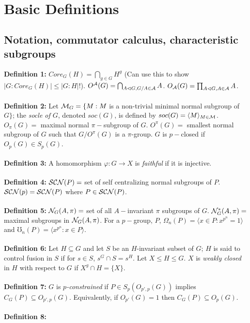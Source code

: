 \chapter{Basic Definitions}
\section{Notation, commutator calculus, characteristic subgroups}
{\bf Definition 1:}
$Core_G(H)= \bigcap_{g \in G} H^g$ (Can use this to show $|G:Core_G(H)|\le |G:H|!$).
$O^{\cal A}(G)= \bigcap_{A \lhd G, G/A \in {\cal A}} A$.
$O_{\cal A}(G)= \prod_{A \lhd G, A \in {\cal A}} A$.\\
\\
{\bf Definition 2:} Let ${\cal M}_G= \{ M: M$ is a non-trivial minimal normal subgroup of $G\}$;
the \emph{socle of $G$}, denoted
$soc(G)$, is defined by
$soc(G)= \langle M \rangle_{M \in {\cal M}}$.
$O_{\pi}(G)=$ maximal normal $\pi-$subgroup of $G$.
$O^{\pi}(G)=$ smallest normal subgroup of $G$ such that $G/O^{\pi}(G)$ is a $\pi$-group.
$G$ is $p-$closed if $O_p(G) \in S_p(G)$.
\\
\\
{\bf Definition 3:}
A homomorphism $\varphi: G \rightarrow X$ is \emph {faithful} if it is injective.
\\
\\
{\bf Definition 4:}
${\cal SCN}(P)=$ set of self centralizing normal subgroups of $P$.
${\cal SCN}(p)= {\cal SCN}(P)$ where $P \in {\cal SCN}(P)$.
\\
\\
{\bf Definition 5:}
${\cal N}_G(A, \pi)=$ set of all $A-$invariant $\pi$ subgroups of $G$.
${\cal N}_G^*(A, \pi)=$ maximal subgroups in ${\cal N}_G(A, \pi)$.  For a $p-$group, $P$,
$\Omega_n(P)= 
\langle x \in P: x^{p^n}=1 \rangle $ and
$\mho_n(P)= \langle x^{p^n}: x \in P \rangle $.
\\
\\
{\bf Definition 6:} Let $H \subseteq G$ and let $S$ be an $H$-invariant subset of $G$;
$H$ is said to 
control fusion in $S$ if for $s \in S$, $s^G \cap S = s^H$.
Let $X \le H \le G$.  $X$ is \emph{weakly closed} in $H$ with respect to $G$ if
$X^g \cap H = \{X\}$.\\
\\
{\bf Definition 7:}
$G$ is $p$\emph{-constrained} if 
$P \in S_p ( O_{p',p} (G))$ implies $C_G(P) \subseteq O_{p',p} (G)$.
Equivalently, if $O_{p'}(G)=1$ then $C_G(P) \subseteq O_p(G)$.
\\
\\
{\bf Definition 8:}
